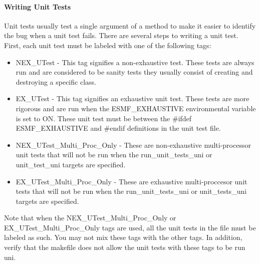 \paragraph{Writing Unit Tests}

Unit tests usually test a single argument of a method to make it easier to
identify the bug when a unit test fails.
There are several steps to writing a unit test.
First, each unit test must be labeled with one of the following tags:
\begin{itemize}
\item NEX\_UTest - This tag signifies a non-exhaustive test. These tests are always run and
are considered to be sanity tests they usually consist of creating and destroying a specific class.
\item EX\_UTest - This tag signifies an exhaustive unit test. These tests are more rigorous and
are run when the ESMF\_EXHAUSTIVE environmental variable is set to ON. These unit test must be between the \#ifdef ESMF\_EXHAUSTIVE
and \#endif definitions in the unit test file.
\item NEX\_UTest\_Multi\_Proc\_Only - These are non-exhaustive multi-processor unit tests that will not be
run when the run\_unit\_tests\_uni or unit\_test\_uni targets are specified.
\item EX\_UTest\_Multi\_Proc\_Only - These are exhaustive multi-proccesor unit tests that will not be
run when the run\_unit\_tests\_uni or unit\_tests\_uni targets are specified.
\end{itemize}
Note that when the NEX\_UTest\_Multi\_Proc\_Only or EX\_UTest\_Multi\_Proc\_Only tags are used, all the unit tests in
the file must be labeled as such. You may not mix these tags with the other tags. In addition, verify that the makefile
does not allow the unit tests with these tags to be run uni.

